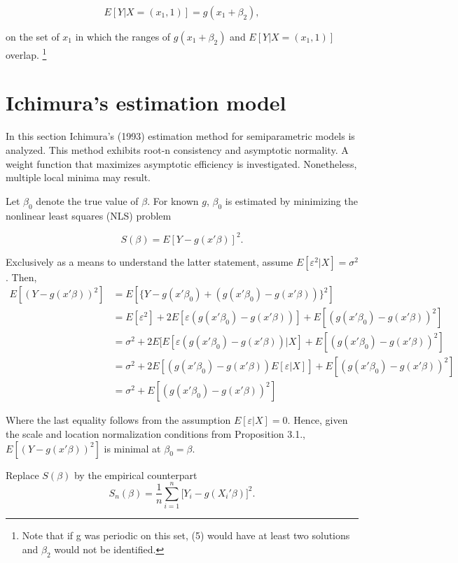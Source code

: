 \begin{equation}
E[Y| X = (x_1,1)] = g(x_1 + \beta_2),
\end{equation}

on the set of $x_1$ in which the ranges of $g(x_1 + \beta_2)$ and $E[Y| X = (x_1,1)]$ overlap. \footnote{Note that if g was periodic on this set, (5) would have at least two solutions and $\beta_2$ would not be identified.}


\section{Ichimura's estimation model} %
\label{sec:Ichimura's estimation model}

In this section Ichimura's (1993) \cite{[6]} estimation method for semiparametric models is analyzed. This method exhibits root-n consistency and asymptotic normality. A weight function that maximizes asymptotic efficiency is investigated. Nonetheless, multiple local minima may result. 

Let $\beta_0$ denote the true value of $\beta$. For known $g$, $\beta_0$ is estimated by minimizing the nonlinear least squares (NLS) problem

\[
S(\beta) = E[Y - g(x'\beta)]^2. \]

Exclusively as a means to understand the latter statement, assume $E[\varepsilon^2|X]=\sigma^2$. Then,
\begin{align*}
E[(Y - g(x'\beta))^2] & = E[\{Y - g(x'\beta_0) + (g(x'\beta_0) - g(x'\beta))\}^2]\\
                   & = E[\varepsilon^2] + 2E[\varepsilon (g(x'\beta_0) - g(x'\beta)) ] + E[(g(x'\beta_0) - g(x'\beta))^2]\\                 & = \sigma^2 + 2E[E[\varepsilon (g(x'\beta_0) - g(x'\beta))|X] + E[(g(x'\beta_0) - g(x'\beta))^2]  \\
                   &= \sigma^2 + 2E[(g(x'\beta_0) - g(x'\beta))E[\varepsilon|X]] + E[(g(x'\beta_0) - g(x'\beta))^2] \\
                   &= \sigma^2 + E[(g(x'\beta_0) - g(x'\beta))^2]
\end{align*}

Where the last equality follows from the assumption $E[\varepsilon|X]=0$. Hence, given the scale and location normalization conditions from Proposition 3.1., $E[(Y - g(x'\beta))^2]$ is minimal at $\beta_0 = \beta$.

Replace $S(\beta)$ by the empirical counterpart 
\begin{equation}
S_n(\beta) = \frac{1}{n}\sum_{i = 1}^n\big[Y_i - g(X_i'\beta)\big]^2.
\end{equation}

